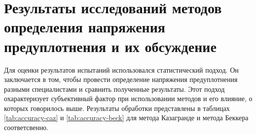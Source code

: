 \chapter{Результаты исследований методов определения напряжения предуплотнения и их обсуждение}


Для оценки результатов испытаний использовался статистический подход.
Он заключается в том, чтобы провести определение напряжения предуплотнения разными специалистами и сравнить полученные результаты. Этот подход охарактеризует субъективный фактор при использовании методов и его влияние, о которых говорилось выше. Результаты обработки представлены в таблицах \ref{tab:accuracy-caz} и \ref{tab:accuracy-beck} для метода Казагранде и метода Беккера соответсвенно.


